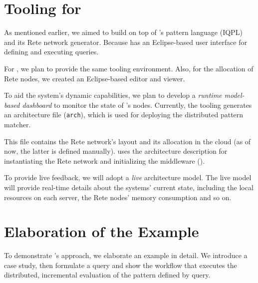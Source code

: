 \section{Tooling for \iqd{}}

As mentioned earlier, 
we aimed to build \iqd{} on top of \eiq{}'s pattern language (IQPL) and its Rete network generator.
Because \eiq{} has an Eclipse-based user interface for defining and executing queries.

For \iqd{}, we plan to provide the same tooling environment. Also, for the allocation of Rete nodes, we created an Eclipse-based editor and viewer.


To aid the system's dynamic capabilities, we plan to develop a \emph{runtime model-based dashboard} to monitor the state of \iqd{}'s nodes. Currently, the \iqd{} tooling generates an architecture file (\texttt{arch}), which is used for deploying the distributed pattern matcher.

This file contains the Rete network's layout and its allocation in the cloud (as of now, the latter is defined manually). \iqd{} uses the architecture description for instantiating the Rete network and initializing the middleware ().


To provide live feedback, we will adopt a \emph{live} architecture model. The live model will provide real-time details about the systems' current state, including the local resources on each server, the Rete nodes' memory consumption and so on.




\section{Elaboration of the Example}
\label{overview-elaboration}

To demonstrate \iqd{}'s approach, we elaborate an example in detail. We introduce a case study, then formulate a query and show the workflow that executes the distributed, incremental evaluation of the pattern defined by query.


